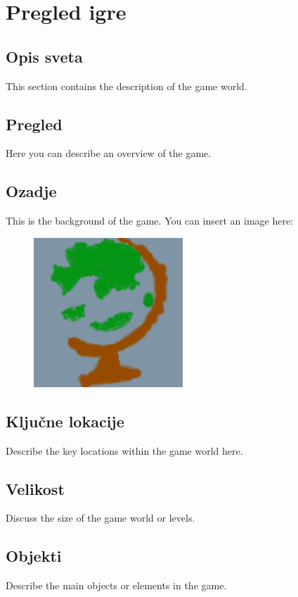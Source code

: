 \documentclass[a4paper, 12pt]{book}
\begin{document}
\section{Pregled igre}

\subsection{Opis sveta}
\noindent This section contains the description of the game world.

\subsection{Pregled}
\noindent Here you can describe an overview of the game.

\subsection{Ozadje}
\noindent This is the background of the game. You can insert an image here:

\begin{figure}[h!]
    \centering
    \includegraphics[width=0.5\textwidth]{./slika.png}
\end{figure}

\subsection{Ključne lokacije}
\noindent Describe the key locations within the game world here.

\subsection{Velikost}
\noindent Discuss the size of the game world or levels.

\subsection{Objekti}
\noindent Describe the main objects or elements in the game.
\end{document}
